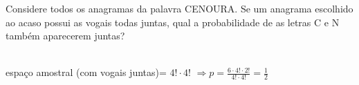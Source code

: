 \begin{ex}
Considere todos os anagramas da palavra CENOURA. Se um anagrama escolhido ao acaso possui as vogais todas juntas, qual a probabilidade de as letras C e N também aparecerem juntas?
  \begin{sol}
    \phantom{A}\\
    espaço amostral (com vogais juntas)= $4!\cdot4!$\hspace{0,5cm} $ \Longrightarrow p=\frac{6\cdot4!\cdot2!}{4!\cdot4!}=\frac{1}{2}$
  \end{sol}
\end{ex}